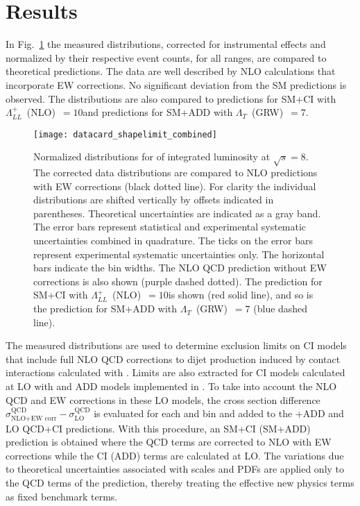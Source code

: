 \documentclass[11pt,twoside,a4paper,cmspaper,final,collab]{cms-tdr}
\begin{document}
\section{Results}

In Fig.~\ref{fig:data_results} the measured \chijj distributions, corrected for instrumental effects and
normalized by their respective event counts, for all \mjj ranges, are compared to
theoretical predictions. The data are
well described by NLO calculations that incorporate EW corrections.
No significant deviation from the SM predictions is observed.
The distributions are also compared to predictions for SM+CI with
$\Lambda_{LL}^{+}$~(NLO)~$=10$\TeV and predictions for SM+ADD with
$\Lambda_{T}$~(GRW)~$=7$\TeV.

\begin{figure}[h!!!]
  \centering
  \texttt{[image: datacard\_shapelimit\_combined]}
  \caption{Normalized \chijj distributions for \intlumi of integrated
    luminosity at $\sqrt{s} = 8$\TeV. The corrected data distributions are compared to NLO
    predictions with EW corrections (black dotted line).  For clarity the
    individual distributions are shifted vertically by offsets
    indicated in parentheses. Theoretical uncertainties are indicated as
    a gray band. The error bars represent statistical and experimental
    systematic uncertainties combined in quadrature. The ticks on the
    error bars represent experimental systematic uncertainties
    only. The horizontal bars indicate the bin widths.
    The NLO QCD prediction without EW corrections is also shown (purple dashed dotted).
    The prediction for SM+CI with
    $\Lambda_{LL}^{+}$~(NLO)~$=10$\TeV is shown (red solid line), and
    so is the prediction for SM+ADD with $\Lambda_{T}$~(GRW)~$=7$\TeV
    (blue dashed line).}
  \label{fig:data_results}
\end{figure}


The measured \chijj distributions are used to determine exclusion limits on CI models that
include full NLO QCD corrections to dijet production induced by
contact interactions calculated with \CIJET. Limits are also extracted for
CI models calculated at LO with \CIJET and
ADD models implemented in \PYTHIAE.
To take into account the NLO QCD and EW corrections in these LO
models, the cross section difference
$\sigma^{\text{QCD}}_{\text{NLO+EW corr}} - \sigma^{\text{QCD}}_{\text{LO}}$
is evaluated for each \mjj and \chijj bin and added to the \PYTHIAE+ADD and LO QCD+CI
predictions. With this procedure, an SM+CI (SM+ADD) prediction is
obtained where the QCD terms are corrected to NLO with EW corrections while the CI (ADD)
terms are calculated at LO.
The variations due to theoretical uncertainties associated with scales
and PDFs are applied only to the QCD terms of the prediction,
thereby treating the effective new physics terms as fixed benchmark terms.
\end{document}
